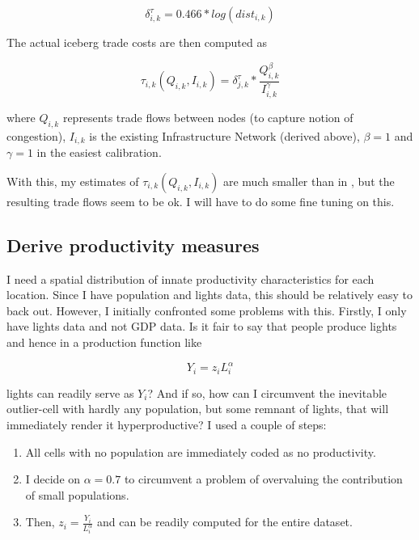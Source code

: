 \documentclass[11pt, oneside]{article}   	%
\begin{document}
\begin{equation}
  \delta^{\tau}_{i,k} =  0.466*log(dist_{i, k})
\end{equation}

The actual iceberg trade costs are then computed as

\begin{equation}
  \tau_{i,k}(Q_{i,k}, I_{i,k}) = \delta^{\tau}_{j, k} * \frac{Q_{i,k}^{\beta}}{I_{i,k}^{\gamma}}
\end{equation}

where $Q_{i,k}$ represents trade flows between nodes (to capture notion of congestion), $I_{i,k}$ is the existing Infrastructure Network (derived above), $\beta = 1$ and $\gamma = 1$ in the easiest calibration.

With this, my estimates of $\tau_{i,k}(Q_{i,k}, I_{i,k})$ are much smaller than in \cite{fajgelbaum_optimal_2017}, but the resulting trade flows seem to be ok. I will have to do some fine tuning on this.

\subsection{Derive productivity measures}

I need a spatial distribution of innate productivity characteristics for each location. Since I have population and lights data, this should be relatively easy to back out. However, I initially confronted some problems with this. Firstly, I only have lights data and not GDP data. Is it fair to say that people produce lights and hence in a production function like

\begin{equation}
  Y_{i} = z_{i}L_{i}^{\alpha}
\end{equation}

lights can readily serve as $Y_{i}$? And if so, how can I circumvent the inevitable outlier-cell with hardly any population, but some remnant of lights, that will immediately render it hyperproductive? I used a couple of steps:

\begin{enumerate}
  \item All cells with no population are immediately coded as no productivity.
  \item I decide on $\alpha = 0.7$ to circumvent a problem of overvaluing the contribution of small populations.
  \item Then, $z_{i} = \frac{Y_{i}}{L_{i}^{\alpha}}$ and can be readily computed for the entire dataset.
\end{enumerate}
\end{document}

